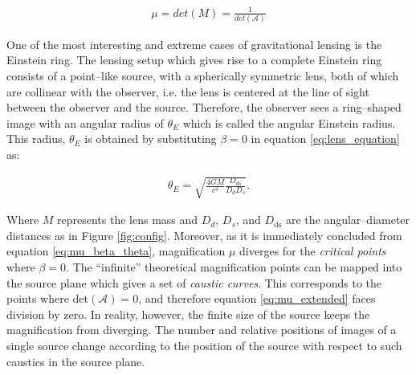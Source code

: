 \documentclass[a4wide,12pt]{book}
\begin{document}
{\begin{eqnarray}
\label{eq:mu_extended}
\mu = det(M) = \frac{1}{det(\mathcal{A})}
\end{eqnarray}

One of the most interesting and extreme cases of gravitational lensing is the Einstein ring. The lensing setup which gives rise to a complete Einstein ring consists of a point--like source, with a spherically symmetric lens, both of which are collinear with the observer, i.e. the lens is centered at the line of sight between the observer and the source. Therefore, the observer sees a ring--shaped image with an angular radius of $\theta_E$ which is called the angular Einstein radius. This radius, $\theta_E$ is obtained by substituting $\beta=0$ in equation \ref{eq:lens_equation} as:

\begin{eqnarray}
\theta_E = \sqrt{\frac{4GM}{c^2}\frac{D_{ds}}{D_dD_s}}.
\label{eq:lens}
\end{eqnarray}

 Where $M$ represents the lens mass and $D_d$, $D_s$, and $D_\mathrm{ds}$ are the angular--diameter distances as in Figure \ref{fig:config}. Moreover, as it is immediately concluded from equation \ref{eq:mu_beta_theta}, magnification $\mu$ diverges for the \emph{critical points} where $\beta=0$. The ``infinite'' theoretical magnification points can be mapped into the source plane which gives a set of \emph{caustic curves}. This corresponds to the points where det$(\mathcal{A}) = 0$, and therefore equation \ref{eq:mu_extended} faces division by zero. In reality, however, the finite size of the source keeps the magnification from diverging. The number and relative positions of images of a single source change according to the position of the source with respect to such caustics in the source plane. %

}
\end{document}

